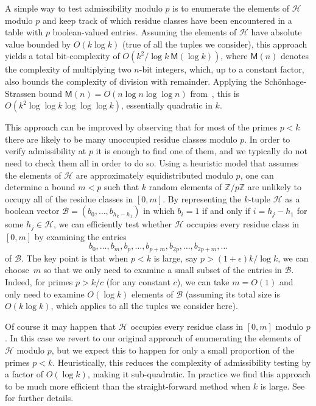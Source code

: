 \documentclass{bmcart}
\theoremstyle{plain}
\theoremstyle{definition}
\newcommand\Z{\mathbb{Z}}
\begin{document}
A simple way to test admissibility modulo $p$ is to  enumerate the elements of $\mathcal{H}$ modulo $p$ and keep track of which residue classes have been encountered in a table with $p$ boolean-valued entries.
Assuming the elements of $\mathcal{H}$ have absolute value bounded by $O(k\log k)$ (true of all the tuples we consider), this approach yields a total bit-complexity of $O(k^2/\log k\ \textsf{M}(\log k))$, where $\textsf{M}(n)$ denotes the complexity of multiplying two $n$-bit integers, which, up to a constant factor, also bounds the complexity of division with remainder.
Applying the Sch\"onhage-Strassen bound $\textsf{M}(n)=O(n\log n\log\log n)$ from~\cite{schonhage}, this is $O(k^2\log\log k\log\log\log k)$, essentially quadratic in $k$.

This approach can be improved by observing that for most of the primes $p < k$ there are likely to be many unoccupied residue classes modulo $p$.  In order to verify admissibility at $p$ it is enough to find one of them, and we typically do not need to check them all in order to do so.  Using a heuristic model that assumes the elements of $\mathcal{H}$ are approximately equidistributed modulo $p$, one can determine a bound $m < p$ such that $k$ random elements of $\Z/p\Z$ are unlikely to occupy all of the residue classes in $[0,m]$.  By representing the $k$-tuple $\mathcal{H}$ as a boolean vector $\mathcal{B}=(b_0,\ldots,b_{h_k-h_1})$ in which $b_i=1$ if and only if $i=h_j-h_1$ for some $h_j\in \mathcal{H}$, we can efficiently test whether $\mathcal{H}$ occupies every residue class in $[0,m]$ by examining the entries
\[
b_0,\ldots,b_m,b_p,\ldots,b_{p+m},b_{2p},\ldots,b_{2p+m},\ldots
\]
of $\mathcal{B}$.
The key point is that when $p<k$ is large, say $p > (1+\epsilon)k/\log k$, we can choose~$m$ so that we only need to examine a small subset of the entries in $\mathcal{B}$.
Indeed, for primes $p > k/c$ (for any constant $c$), we can take $m=O(1)$ and only need to examine $O(\log k)$ elements of $\mathcal{B}$ (assuming its total size is $O(k\log k)$, which applies to all the tuples we consider here).

Of course it may happen that $\mathcal{H}$ occupies every residue class in $[0,m]$ modulo $p$.
In this case we revert to our original approach of enumerating the elements of $\mathcal{H}$ modulo $p$, but we expect this to happen for only a small proportion of the primes $p < k$.
Heuristically, this reduces the complexity of admissibility testing by a factor of $O(\log k)$, making it sub-quadratic.  In practice we find this approach to be much more efficient than the straight-forward method when $k$ is large.  See \cite[\S 3.1]{polymath8a} for further details.
\end{document}

